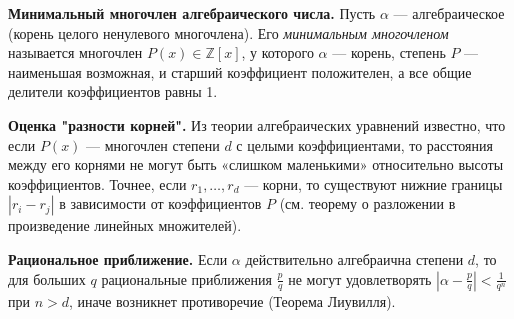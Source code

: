 
\textbf{Минимальный многочлен алгебраического числа.}
Пусть $\alpha$ — алгебраическое (корень целого ненулевого многочлена). Его \emph{минимальным многочленом} называется многочлен $P(x)\in \mathbb{Z}[x]$, у которого $\alpha$ — корень, степень $P$ — наименьшая возможная, и старший коэффициент положителен, а все общие делители коэффициентов равны 1.

\medskip

\textbf{Оценка "разности корней".}
Из теории алгебраических уравнений известно, что если $P(x)$ — многочлен степени $d$ с целыми коэффициентами, то расстояния между его корнями не могут быть «слишком маленькими» относительно высоты коэффициентов. Точнее, если $r_1,\dots,r_d$ — корни, то существуют нижние границы $|r_i-r_j|$ в зависимости от коэффициентов $P$ (см. теорему о разложении в произведение линейных множителей).

\medskip

\textbf{Рациональное приближение.}
Если $\alpha$ действительно алгебраична степени $d$, то для больших $q$ рациональные приближения $\frac{p}{q}$ не могут удовлетворять $|\alpha - \frac{p}{q}| < \tfrac{1}{q^n}$ при $n>d$, иначе возникнет противоречие (Теорема Лиувилля).

